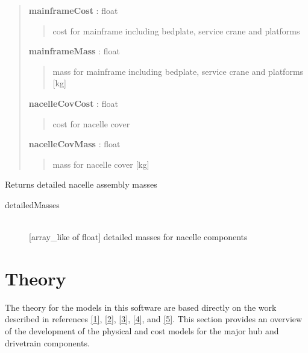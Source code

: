 \documentclass[letterpaper,10pt,openany,oneside]{sphinxmanual}
\begin{document}
\begin{fulllineitems}
\begin{quote}
\begin{description}
\textbf{mainframeCost} : float
\begin{quote}

cost for mainframe including bedplate, service crane and platforms
\end{quote}

\textbf{mainframeMass} : float
\begin{quote}

mass for mainframe including bedplate, service crane and platforms {[}kg{]}
\end{quote}

\textbf{nacelleCovCost} : float
\begin{quote}

cost for nacelle cover
\end{quote}

\textbf{nacelleCovMass} : float
\begin{quote}

mass for nacelle cover {[}kg{]}
\end{quote}

\end{description}\end{quote}

\begin{fulllineitems}
\label{documentation:nacelleSE.src.nacelleSE.NacelleSystem.getNacelleComponentMasses}
Returns detailed nacelle assembly masses
\begin{description}
\item[{detailedMasses}] \leavevmode\\{[}array\_like of float{]}
detailed masses for nacelle components

\end{description}

\end{fulllineitems}


\end{fulllineitems}



\chapter{Theory}
\label{theory::doc}\label{theory:theory}\label{theory:id1}
The theory for the models in this software are based directly on the work described in references {\hyperref[theory:1]{{[}1{]}}}, {\hyperref[theory:2]{{[}2{]}}}, {\hyperref[theory:3]{{[}3{]}}}, {\hyperref[theory:4]{{[}4{]}}}, and {\hyperref[theory:5]{{[}5{]}}}.  This section provides an overview of the development of the physical and cost models for the major hub and drivetrain components.
\end{document}
